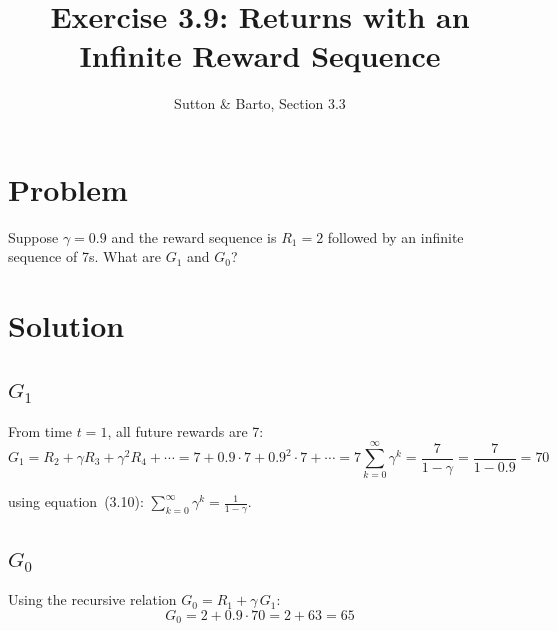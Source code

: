 \documentclass[11pt]{article}
\title{Exercise 3.9: Returns with an Infinite Reward Sequence}
\author{Sutton \& Barto, Section 3.3}
\date{}
\begin{document}
\maketitle

\section*{Problem}

Suppose $\gamma = 0.9$ and the reward sequence is $R_1 = 2$ followed by an
infinite sequence of 7s. What are $G_1$ and $G_0$?

\section*{Solution}

\subsection*{$G_1$}

From time $t = 1$, all future rewards are 7:
\[
    G_1 = R_2 + \gamma R_3 + \gamma^2 R_4 + \cdots
    = 7 + 0.9 \cdot 7 + 0.9^2 \cdot 7 + \cdots
    = 7 \sum_{k=0}^{\infty} \gamma^k
    = \frac{7}{1 - \gamma}
    = \frac{7}{1 - 0.9}
    = \boxed{70}
\]

using equation~(3.10): $\sum_{k=0}^{\infty} \gamma^k = \frac{1}{1-\gamma}$.

\subsection*{$G_0$}

Using the recursive relation $G_0 = R_1 + \gamma\, G_1$:
\[
    G_0 = 2 + 0.9 \cdot 70 = 2 + 63 = \boxed{65}
\]
\end{document}
